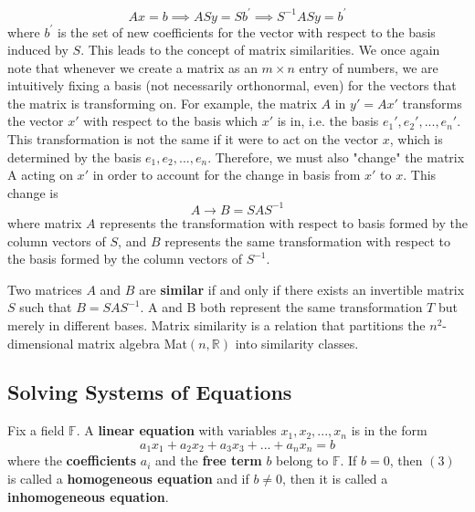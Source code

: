   \begin{equation}
    A x = b \implies A S y = S b^\prime \implies S^{-1} A S y = b^\prime
  \end{equation}
  where $b^\prime$ is the set of new coefficients for the vector with respect to the basis induced by $S$. 
  This leads to the concept of matrix similarities. We once again note that whenever we create a matrix as an $m \times n$ entry of numbers, we are intuitively fixing a basis (not necessarily orthonormal, even) for the vectors that the matrix is transforming on. For example, the matrix $A$ in $y' = Ax'$ transforms the vector $x'$ with respect to the basis which $x'$ is in, i.e. the basis ${e_1', e_2', ..., e_n'}$. This transformation is not the same if it were to act on the vector $x$, which is determined by the basis ${e_1, e_2, ..., e_n}$. Therefore, we must also "change" the matrix A acting on $x'$ in order to account for the change in basis from $x'$ to $x$. This change is 
  \begin{equation}
    A \rightarrow B = S A S^{-1}
  \end{equation}
  where matrix $A$ represents the transformation with respect to basis formed by the column vectors of $S$, and $B$ represents the same transformation with respect to the basis formed by the column vectors of $S^{-1}$. 

  \begin{definition}
    Two matrices $A$ and $B$ are \textbf{similar} if and only if there exists an invertible matrix $S$ such that $B = S A S^{-1}$. A and B both represent the same transformation $T$ but merely in different bases. Matrix similarity is a relation that partitions the $n^2$-dimensional matrix algebra Mat$(n, \mathbb{R})$ into similarity classes. 
  \end{definition}

\subsection{Solving Systems of Equations}

  \begin{definition}
    Fix a field $\mathbb{F}$. A \textbf{linear equation} with variables $x_1, x_2, ..., x_n$ is in the form 
    \begin{equation}
      a_1 x_1 + a_2 x_2 + a_3 x_3 + ... + a_n x_n = b
    \end{equation}
    where the \textbf{coefficients} $a_i$ and the \textbf{free term} $b$ belong to $\mathbb{F}$. If $b = 0$, then $(3)$ is called a \textbf{homogeneous equation} and if $b \neq 0$, then it is called a \textbf{inhomogeneous equation}. 
  \end{definition}

